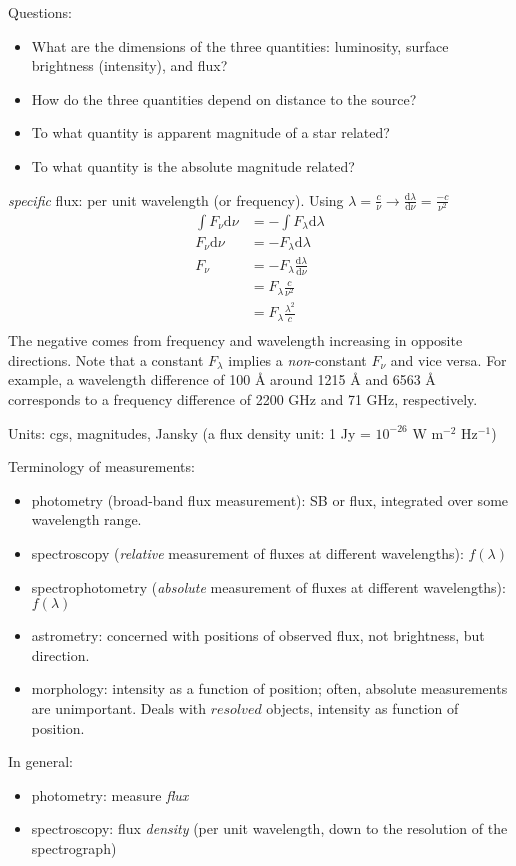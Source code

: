 \documentclass[12pt]{article}
\begin{document}
Questions:
\begin{itemize}
    \item What are the dimensions of the three quantities: luminosity,
        surface brightness (intensity), and flux?
    \item How do the three quantities depend on distance to the source?
    \item To what quantity is apparent magnitude of a star related?
    \item To what quantity is the absolute magnitude related?
\end{itemize}
\emph{specific} flux: per unit wavelength (or frequency).
Using $\lambda=\frac{c}{\nu} \rightarrow
\frac{\textrm{d}\lambda}{\textrm{d}\nu} = \frac{-c}{\nu^{2}}$
\begin{align*}
    \int F_{\nu} \textrm{d} \nu &= -\int F_{\lambda} \textrm{d} \lambda\\
    F_{\nu} \textrm{d} \nu &= -F_{\lambda} \textrm{d} \lambda\\
    F_{\nu} &= -F_{\lambda} \frac{\textrm{d} \lambda}{\textrm{d}\nu}\\
    &= F_{\lambda} \frac{c}{\nu^{2}}\\
    &= F_{\lambda} \frac{\lambda^{2}}{c}\\
\end{align*}
The negative comes from frequency and wavelength increasing in
opposite directions.
Note that a constant $F_{\lambda}$ implies a \emph{non}-constant $F_{\nu}$
and vice versa. For example, a wavelength difference of 100 \AA{}
around 1215 \AA{} and 6563 \AA{} corresponds to a frequency difference
of 2200 GHz and 71 GHz, respectively.

Units: cgs, magnitudes, Jansky (a flux density unit:
1 Jy = $10^{-26}$ W m$^{-2}$ Hz$^{-1}$)

Terminology of measurements:
\begin{itemize}
    \item photometry (broad-band flux measurement): SB or flux, integrated
        over some wavelength range.
    \item spectroscopy (\emph{relative} measurement of fluxes at
        different wavelengths):
        $f(\lambda)$
    \item spectrophotometry (\emph{absolute} measurement of fluxes at
        different wavelengths):
        $f(\lambda)$
    \item astrometry: concerned with positions of observed flux, not brightness,
        but direction.
    \item morphology: intensity as a function of position;
        often, absolute measurements are unimportant. Deals with $resolved$
        objects, intensity as function of position.
\end{itemize}
In general:
\begin{itemize}
    \item photometry: measure \emph{flux}
    \item spectroscopy: flux \emph{density} (per unit wavelength,
        down to the resolution of the spectrograph)
\end{itemize}
\end{document}
